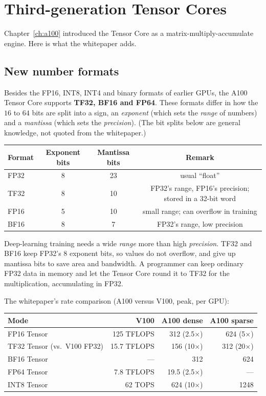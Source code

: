 \section{Third-generation Tensor Cores}
\oos

Chapter~\ref{ch:a100} introduced the Tensor Core as a matrix-multiply-accumulate engine. Here is what the whitepaper adds.

\subsection{New number formats}

Besides the FP16, INT8, INT4 and binary formats of earlier GPUs, the A100 Tensor Core supports \textbf{TF32, BF16 and FP64}.
These formats differ in how the $16$ to $64$ bits are split into a sign, an \emph{exponent} (which sets the \emph{range} of numbers) and a \emph{mantissa} (which sets the \emph{precision}).
(The bit splits below are general knowledge, not quoted from the whitepaper.)

\begin{center}\small
\begin{tabular}{@{}lccc@{}}
\toprule
\textbf{Format} & \textbf{Exponent bits} & \textbf{Mantissa bits} & \textbf{Remark}\\
\midrule
FP32 & 8 & 23 & usual ``float''\\
TF32 & 8 & 10 & FP32's range, FP16's precision; stored in a 32-bit word\\
FP16 & 5 & 10 & small range; can overflow in training\\
BF16 & 8 & 7 & FP32's range, low precision\\
\bottomrule
\end{tabular}
\end{center}
\begin{intuition}
Deep-learning training needs a wide \emph{range} more than high \emph{precision}. TF32 and BF16 keep FP32's $8$ exponent bits, so values do not overflow, and give up mantissa bits to save area and bandwidth.
A programmer can keep ordinary FP32 data in memory and let the Tensor Core round it to TF32 for the multiplication, accumulating in FP32.
\end{intuition}

The whitepaper's rate comparison (A100 versus V100, peak, per GPU):
\begin{center}\small
\begin{tabular}{@{}lrrr@{}}
\toprule
\textbf{Mode} & \textbf{V100} & \textbf{A100 dense} & \textbf{A100 sparse}\\
\midrule
FP16 Tensor & 125 TFLOPS & 312 (2.5$\times$) & 624 (5$\times$)\\
TF32 Tensor (vs.\ V100 FP32) & 15.7 TFLOPS & 156 (10$\times$) & 312 (20$\times$)\\
BF16 Tensor & --- & 312 & 624\\
FP64 Tensor & 7.8 TFLOPS & 19.5 (2.5$\times$) & ---\\
INT8 Tensor & 62 TOPS & 624 (10$\times$) & 1248\\
\bottomrule
\end{tabular}
\end{center}

